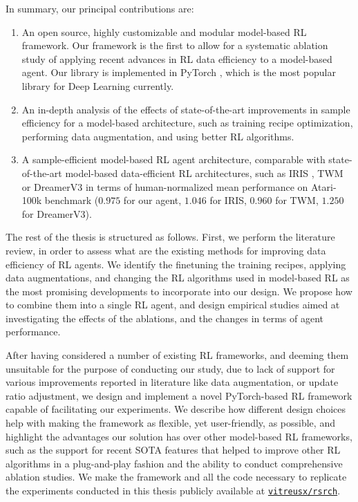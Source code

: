 \documentclass[en]{pracamgr}
\begin{document}
In summary, our principal contributions are:

\begin{enumerate}
  \item An open source, highly customizable and modular model-based RL framework. Our framework is the first to allow for a systematic ablation study of applying recent advances in RL data efficiency to a model-based agent. Our library is implemented in PyTorch \autocite{paszkePyTorchImperativeStyle2019}, which is the most popular library for Deep Learning currently.
  \item An in-depth analysis of the effects of state-of-the-art improvements in sample efficiency for a model-based architecture, such as training recipe optimization, performing data augmentation, and using better RL algorithms.
  \item A sample-efficient model-based RL agent architecture, comparable with state-of-the-art model-based data-efficient RL architectures, such as IRIS \autocite{micheliTransformersAreSampleEfficient2023}, TWM \autocite{robineTransformerbasedWorldModels2023} or DreamerV3 \autocite{hafnerMasteringDiverseDomains2024} in terms of human-normalized mean performance on Atari-100k benchmark ($0.975$ for our agent, $1.046$ for IRIS, $0.960$ for TWM, $1.250$ for DreamerV3).
\end{enumerate}

The rest of the thesis is structured as follows. First, we perform the literature review, in order to assess what are the existing methods for improving data efficiency of RL agents. We identify the finetuning the training recipes, applying data augmentations, and changing the RL algorithms used in model-based RL as the most promising developments to incorporate into our design. We propose how to combine them into a single RL agent, and design empirical studies aimed at investigating the effects of the ablations, and the changes in terms of agent performance.

After having considered a number of existing RL frameworks, and deeming them unsuitable for the purpose of conducting our study, due to lack of support for various improvements reported in literature like data augmentation, or update ratio adjustment, we design and implement a novel PyTorch-based \autocite{paszkePyTorchImperativeStyle2019} RL framework capable of facilitating our experiments. We describe how different design choices help with making the framework as flexible, yet user-friendly, as possible, and highlight the advantages our solution has over other model-based RL frameworks, such as the support for recent SOTA features that helped to improve other RL algorithms in a plug-and-play fashion and the ability to conduct comprehensive ablation studies. We make the framework and all the code necessary to replicate the experiments conducted in this thesis publicly available at \href{https://github.com/vitreusx/rsrch}{\tt vitreusx/rsrch}.
\end{document}
